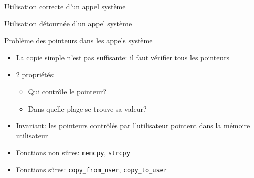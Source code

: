 \begin{frame}{Utilisation correcte d'un appel système}
\centering

\end{frame}

\begin{frame}{Utilisation détournée d'un appel système}
\centering

\end{frame}

\begin{frame}{Problème des pointeurs dans les appels système}

\begin{itemize}
    \item La copie simple n'est pas suffisante: il faut vérifier tous les pointeurs
    \item 2 propriétés:
    \begin{itemize}
        \item Qui contrôle le pointeur?
        \item Dans quelle plage se trouve sa valeur?
    \end{itemize}
    \item Invariant: les pointeurs contrôlés par l'utilisateur pointent dans la
        mémoire utilisateur
    \item Fonctions non sûres: \texttt{memcpy}, \texttt{strcpy}
    \item Fonctions sûres: \texttt{copy\_from\_user}, \texttt{copy\_to\_user}
\end{itemize}

\end{frame}

\def\ssout{\bgroup
 \markoverwith{\lower-0.2ex\hbox
 {\kern-.03em\vbox{\hrule width.2em\kern0.45ex\hrule}\kern-.03em}}%
 \ULon}
\MakeRobust\dout

